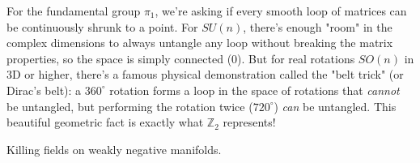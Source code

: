 \begin{solution}
\medskip
For the fundamental group $\pi_1$, we're asking if every smooth loop of matrices can be continuously shrunk to a point. For $SU(n)$, there's enough "room" in the complex dimensions to always untangle any loop without breaking the matrix properties, so the space is simply connected ($0$). But for real rotations $SO(n)$ in 3D or higher, there's a famous physical demonstration called the "belt trick" (or Dirac's belt): a $360^\circ$ rotation forms a loop in the space of rotations that \textit{cannot} be untangled, but performing the rotation twice ($720^\circ$) \textit{can} be untangled. This beautiful geometric fact is exactly what $\mathbb{Z}_2$ represents!
\end{solution}

\begin{exercise}
\label{geometry:2019:10}
Killing fields on weakly negative manifolds.
\end{exercise}

